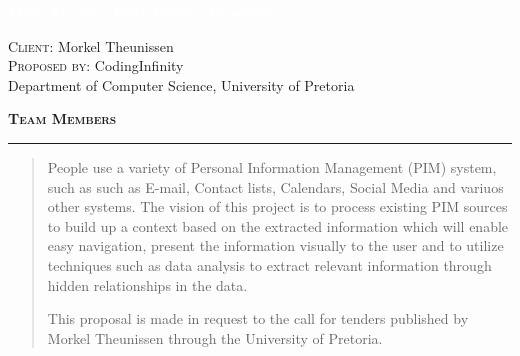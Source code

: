 \documentclass[11pt,a4paper,sans]{article}
\begin{document}
\begin{titlepage}
\BgThispage
{}
\vspace*{0.1\textheight}
\noindent
\textcolor{white}{\Huge\textbf{\textsf{Mind Mapped PIM Project Proposal}}}
\vspace*{4cm}
\noindent
\begin{center}
			\textsc{Client:} {\huge Morkel Theunissen} \\
			\vspace*{0.3cm}
			\textsc{Proposed by:} {\huge CodingInfinity} \\
			\vspace*{0.1cm}
			\small Department of Computer Science, University of Pretoria \\
			\hfill
\end{center}
\vspace*{1.5cm}
\begin{minipage}{0.35\linewidth}
		\begin{center}
			\textsc{\textbf{Team Members}}
		\end{center}
    \begin{flushright}
        
    \end{flushright}
\end{minipage} \hspace{15pt}
\begin{minipage}{0.02\linewidth}
    \rule{1pt}{140pt}
\end{minipage} \hspace{-10pt}
\begin{minipage}{0.63\linewidth}
\vspace{5pt}
  \begin{abstract}
		People use a variety of Personal Information Management (PIM) system, such as such as E-mail, Contact lists, Calendars, Social Media and variuos other systems. The vision of this project is to process existing PIM sources to build up a context based on the extracted information which will enable easy navigation, present the information visually to the user and to utilize techniques such as data analysis to extract relevant information through hidden relationships in the data.

    This proposal is made in request to the call for tenders published by Morkel Theunissen through the University of Pretoria.
  \end{abstract}
\end{minipage}


\end{titlepage}
\end{document}
